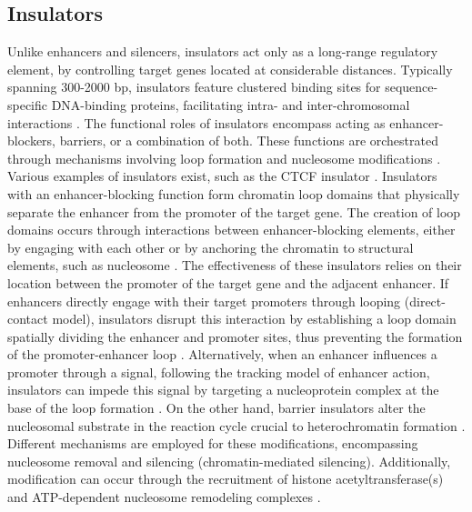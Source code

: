 \documentclass[a4paper, titlepage, openright]{book}
\begin{document}
\subsection{Insulators}
Unlike enhancers and silencers, insulators act only as a long-range regulatory element, by controlling target genes located at considerable distances. Typically spanning 300-2000 bp, insulators feature clustered binding sites for sequence-specific DNA-binding proteins, facilitating intra- and inter-chromosomal interactions \citep{valenzuela2006chromatin}. The functional roles of insulators encompass acting as enhancer-blockers, barriers, or a combination of both. These functions are orchestrated through mechanisms involving loop formation and nucleosome modifications \citep{gaszner2006insulators}. Various examples of insulators exist, such as the CTCF insulator \citep{ishihara2006ctcf}. Insulators with an enhancer-blocking function form chromatin loop domains that physically separate the enhancer from the promoter of the target gene. The creation of loop domains occurs through interactions between enhancer-blocking elements, either by engaging with each other or by anchoring the chromatin to structural elements, such as nucleosome \citep{gaszner2006insulators}. The effectiveness of these insulators relies on their location between the promoter of the target gene and the adjacent enhancer. If enhancers directly engage with their target promoters through looping (direct-contact model), insulators disrupt this interaction by establishing a loop domain spatially dividing the enhancer and promoter sites, thus preventing the formation of the promoter-enhancer loop \citep{gaszner2006insulators}. Alternatively, when an enhancer influences a promoter through a signal, following the tracking model of enhancer action, insulators can impede this signal by targeting a nucleoprotein complex at the base of the loop formation \citep{gaszner2006insulators}. On the other hand, barrier insulators alter the nucleosomal substrate in the reaction cycle crucial to heterochromatin formation \citep{gaszner2006insulators}. Different mechanisms are employed for these modifications, encompassing nucleosome removal and silencing (chromatin-mediated silencing). Additionally, modification can occur through the recruitment of histone acetyltransferase(s) and ATP-dependent nucleosome remodeling complexes \citep{gaszner2006insulators}.

\end{document}
